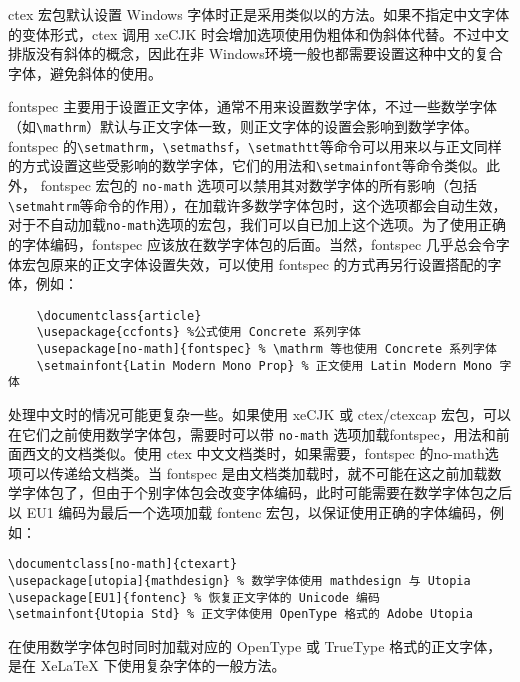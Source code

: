 ctex 宏包默认设置 Windows 字体时正是采用类似以的方法。如果不指定中文字体的变体形式，ctex 调用 xeCJK 时会增加选项使用伪粗体和伪斜体代替。不过中文排版没有斜体的概念，因此在非 Windows环境一般也都需要设置这种中文的复合字体，避免斜体的使用。

fontspec 主要用于设置正文字体，通常不用来设置数学字体，不过一些数学字体（如\verb|\mathrm|）默认与正文字体一致，则正文字体的设置会影响到数学字体。 fontspec 的\verb|\setmathrm|，\verb|\setmathsf|，\verb|\setmathtt|等命令可以用来以与正文同样的方式设置这些受影响的数学字体，它们的用法和\verb|\setmainfont|等命令类似。此外， fontspec 宏包的 \verb|no-math| 选项可以禁用其对数学字体的所有影响（包括\verb|\setmahtrm|等命令的作用），在加载许多数学字体包时，这个选项都会自动生效，对于不自动加载\verb|no-math|选项的宏包，我们可以自已加上这个选项。为了使用正确的字体编码，fontspec 应该放在数学字体包的后面。当然，fontspec 几乎总会令字体宏包原来的正文字体设置失效，可以使用 fontspec 的方式再另行设置搭配的字体，例如：
\begin{lstlisting}
    \documentclass{article}
    \usepackage{ccfonts} %公式使用 Concrete 系列字体
    \usepackage[no-math]{fontspec} % \mathrm 等也使用 Concrete 系列字体
    \setmainfont{Latin Modern Mono Prop} % 正文使用 Latin Modern Mono 字体
\end{lstlisting}

处理中文时的情况可能更复杂一些。如果使用 xeCJK 或 ctex/ctexcap 宏包，可以在它们之前使用数学字体包，需要时可以带 \verb|no-math| 选项加载fontspec，用法和前面西文的文档类似。使用 ctex 中文文档类时，如果需要，fontspec 的no-math选项可以传递给文档类。当 fontspec 是由文档类加载时，就不可能在这之前加载数学字体包了，但由于个别字体包会改变字体编码，此时可能需要在数学字体包之后以 EU1 编码为最后一个选项加载 fontenc 宏包，以保证使用正确的字体编码，例如：
\begin{lstlisting}
\documentclass[no-math]{ctexart}
\usepackage[utopia]{mathdesign} % 数学字体使用 mathdesign 与 Utopia
\usepackage[EU1]{fontenc} % 恢复正文字体的 Unicode 编码
\setmainfont{Utopia Std} % 正文字体使用 OpenType 格式的 Adobe Utopia
\end{lstlisting}

在使用数学字体包时同时加载对应的 OpenType 或 TrueType 格式的正文字体，是在 XeLaTeX 下使用复杂字体的一般方法。

